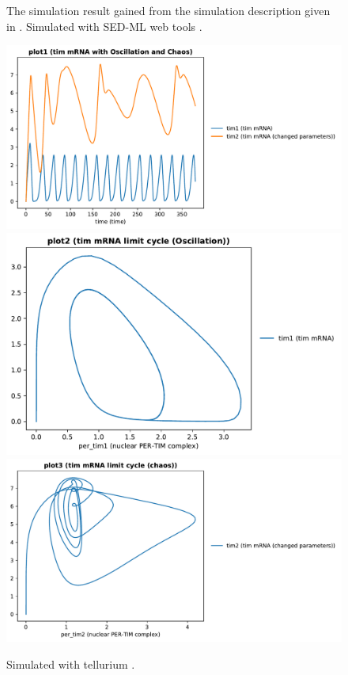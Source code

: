 \begin{figure}[ht]
\begin{minipage}{0.47\textwidth}
        \caption{The simulation result gained from the simulation description given in . Simulated with SED-ML web tools \citep{bergmann2017sed}.}
    \end{minipage}\hfill
    \begin{minipage}{0.47\textwidth}
        \centering
         \includegraphics[width=1.0\textwidth]{examples/leloup-sbml/results/tellurium/plot1}
		\includegraphics[width=1.0\textwidth]{examples/leloup-sbml/results/tellurium/plot2}
		\includegraphics[width=1.0\textwidth]{examples/leloup-sbml/results/tellurium/plot3}
        \caption{Simulated with tellurium \citep{tellurium}.}
    \end{minipage}
    \label{fig:leloup-sbml}
\end{figure}

